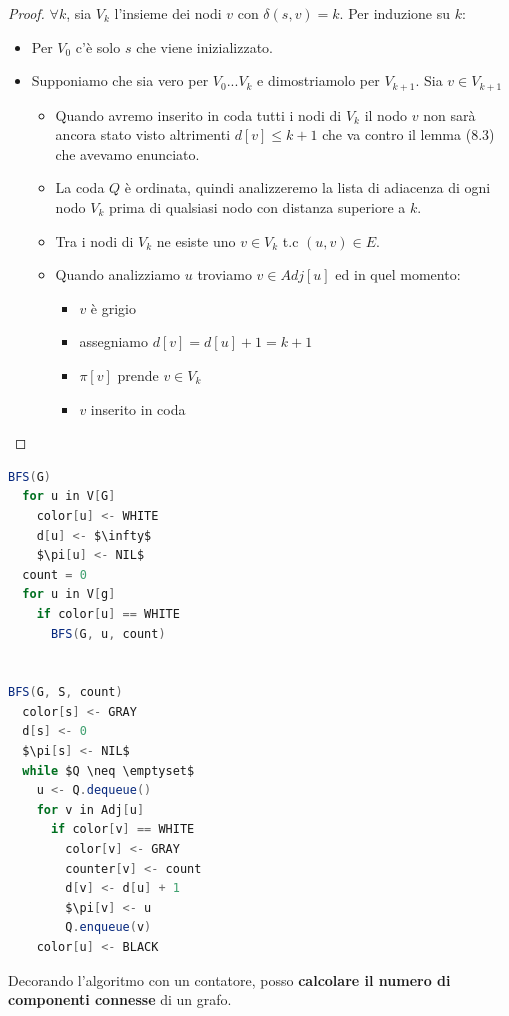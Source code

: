 \documentclass[a4paper]{article}
\begin{document}
\begin{proof}
$\forall k$, sia $V_k$ l'insieme dei nodi $v$ con $\delta(s,v) = k$. Per induzione su $k$:
\begin{itemize}
  \item Per $V_0$ c'è solo $s$ che viene inizializzato.
  \item Supponiamo che sia vero per $V_0 ... V_k$ e dimostriamolo per $V_{k+1}$.
  Sia $v \in V_{k+1}$ 
  \begin{itemize}
    \item Quando avremo inserito in coda tutti i nodi di $V_k$ il nodo $v$ non sarà ancora stato visto altrimenti $d[v] \le k+1$ che va contro il lemma (8.3) che avevamo enunciato.
    \item La coda $Q$ è ordinata, quindi analizzeremo la lista di adiacenza di ogni nodo $V_k$ prima di qualsiasi nodo con distanza superiore a $k$.
    \item Tra i nodi di $V_k$ ne esiste uno $v \in V_k$ t.c $(u,v) \in E$.
    \item Quando analizziamo $u$ troviamo $v \in Adj[u]$ ed in quel momento:
    \begin{itemize}
      \item $v$ è grigio
      \item assegniamo $d[v] = d[u] + 1 = k + 1$
      \item $\pi[v]$ prende $v \in V_k$ 
      \item $v$ inserito in coda
    \end{itemize}
  \end{itemize}
\end{itemize}

\end{proof}

\begin{lstlisting}[language=Scala]
BFS(G)
  for u in V[G]
    color[u] <- WHITE
    d[u] <- $\infty$
    $\pi[u] <- NIL$
  count = 0
  for u in V[g]
    if color[u] == WHITE
      BFS(G, u, count)


BFS(G, S, count)
  color[s] <- GRAY
  d[s] <- 0
  $\pi[s] <- NIL$
  while $Q \neq \emptyset$
    u <- Q.dequeue()
    for v in Adj[u]
      if color[v] == WHITE
        color[v] <- GRAY
        counter[v] <- count
        d[v] <- d[u] + 1
        $\pi[v] <- u
        Q.enqueue(v)
    color[u] <- BLACK
\end{lstlisting}
Decorando l'algoritmo con un contatore, posso \textbf{calcolare il numero di componenti connesse} di un grafo.
\end{document}
